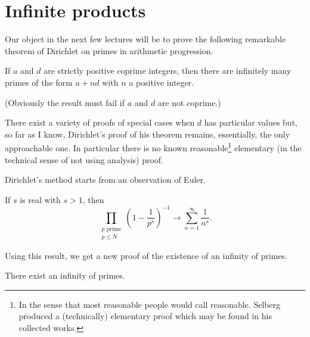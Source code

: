 \section{Infinite products} Our object in the next few
lectures will be to prove the following remarkable
theorem of Dirichlet on primes in arithmetic
progression.
\begin{theorem}[Dirichlet]\label{Dirichlet}
If $a$ and $d$ are strictly
positive coprime integers, then there are infinitely
many primes of the form $a+nd$ with $n$ a positive integer.
\end{theorem}
(Obviously the result must fail if $a$ and $d$ are not
coprime.)

There exist a variety of proofs of special cases
when $d$ has particular values but, so far as I know,
Dirichlet's proof of his theorem remains, essentially,
the only approachable one. In particular there is no
known reasonable\footnote{In the sense that most
reasonable people would call reasonable. Selberg produced
a (technically)  elementary proof which may be found in his
collected works.} elementary
(in the technical sense of not using analysis)
proof.

Dirichlet's method starts from an observation of Euler.
\begin{lemma}\label{Euler prime start}
If $s$ is real with $s>1$, then
\[\prod_{\substack{\text{$p$ prime}\\p\leq N}}
\left(1-\frac{1}{p^{s}}\right)^{-1}\rightarrow
\sum_{n=1}^{\infty}\frac{1}{n^{s}}.\]
\end{lemma}
Using this result, we get a new proof of the existence
of an infinity of primes.
\begin{theorem}[Euclid] There exist an infinity of primes.
\end{theorem}

